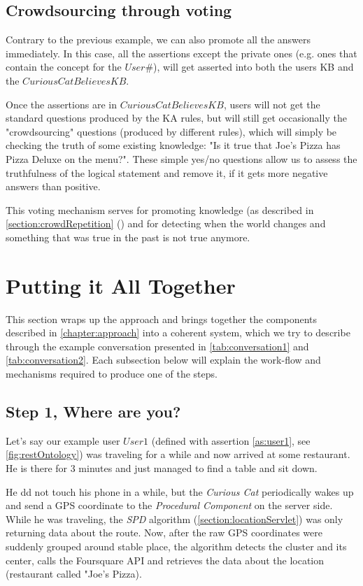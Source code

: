 \subsection{Crowdsourcing through voting}
\label{section:crowdVoting}
Contrary to the previous example, we can also promote all the answers 
immediately. In this case, all the assertions except the private ones 
(e.g. ones that contain the concept for the $User\#$), will get asserted into 
both the users KB and the $CuriousCatBelievesKB$.

Once the assertions are in $CuriousCatBelievesKB$, users will not get the 
standard questions produced by the KA rules, but will still get occasionally 
the "crowdsourcing" questions (produced by different rules), which will 
simply be checking the truth of some existing knowledge: "Is it true that Joe's 
Pizza has Pizza Deluxe on the menu?". These simple yes/no questions allow us to 
assess the truthfulness of the logical statement and remove it, if it gets 
more negative answers than positive.

This voting mechanism serves for promoting knowledge (as described in 
\autoref{section:crowdRepetition} () and for 
detecting when the world changes and something that was true in the past is not 
true anymore.

\section{Putting it All Together}
\label{section:together}
This section wraps up the approach and brings together the components described
in \autoref{chapter:approach} into a coherent system, which we try to describe 
through the example conversation presented in \autoref{tab:conversation1} and
\autoref{tab:conversation2}. Each subsection below will explain the work-flow
and mechanisms required to produce one of the steps.

\subsection{Step 1, Where are you?}
\label{section:step1}
Let's say our example user $User1$ (defined with assertion \ref{as:user1}, see
\ref{fig:restOntology}) was traveling for a while
and now arrived at some restaurant. He is there for 3 minutes and just managed
to find a table and sit down.

He dd not touch his phone in a while, but the \emph{Curious Cat} periodically 
wakes up and send a GPS coordinate to the \emph{Procedural Component} on the
server side. While he was traveling, the \emph{SPD} algorithm 
(\autoref{section:locationServlet}) was only returning data about the route. 
Now, after the
raw GPS coordinates were suddenly grouped around stable place, the algorithm 
detects the cluster and its center, calls the Foursquare API and retrieves the 
data about the location (restaurant called "Joe's Pizza).

